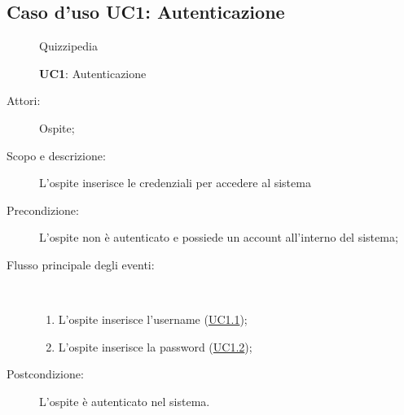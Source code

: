 \hypertarget{UC1}{}
\subsection{Caso d'uso UC1: Autenticazione}
\begin{figure}[H]
	\centering
	\begin{resizedtikzpicture}{\textwidth}
		\begin{umlsystem}[x=0, fill=lightgray!20]{Quizzipedia}
		\end{umlsystem}
	\end{resizedtikzpicture}
	\caption{\textbf{UC1}: Autenticazione}
	\label{UC1}
\end{figure}
\begin{description}
	\item[Attori:] Ospite;
	\item[Scopo e descrizione:] L'ospite inserisce le credenziali per accedere al sistema
	\item[Precondizione:] L'ospite non è autenticato e possiede un account all'interno del sistema;
	
	\item[Flusso principale degli eventi:] \ 
	\begin{enumerate}
		\item L'ospite inserisce l'username (\hyperlink{UC1.1}{UC1.1});
		\item L'ospite inserisce la password (\hyperlink{UC1.2}{UC1.2});
		
	\end{enumerate}
	\item[Postcondizione:] L’ospite è autenticato nel sistema.
\end{description}
\hypertarget{UC1.1}{}
